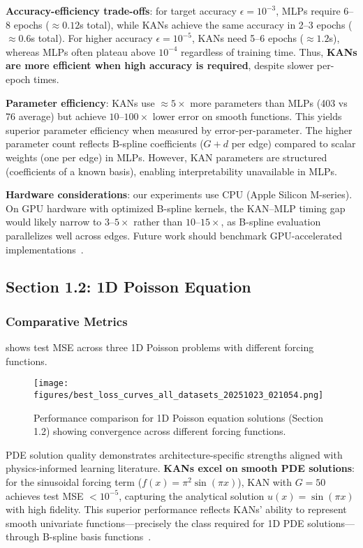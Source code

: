 \documentclass[11pt,a4paper]{article}
\begin{document}
\textbf{Accuracy-efficiency trade-offs}: for target accuracy $\epsilon = 10^{-3}$, MLPs require 6--8 epochs ($\approx 0.12$s total), while KANs achieve the same accuracy in 2--3 epochs ($\approx 0.6$s total). For higher accuracy $\epsilon = 10^{-5}$, KANs need 5--6 epochs ($\approx 1.2$s), whereas MLPs often plateau above $10^{-4}$ regardless of training time. Thus, \textbf{KANs are more efficient when high accuracy is required}, despite slower per-epoch times.

\textbf{Parameter efficiency}: KANs use $\approx 5\times$ more parameters than MLPs (403 vs 76 average) but achieve $10$--$100\times$ lower error on smooth functions. This yields superior parameter efficiency when measured by error-per-parameter. The higher parameter count reflects B-spline coefficients ($G+d$ per edge) compared to scalar weights (one per edge) in MLPs. However, KAN parameters are structured (coefficients of a known basis), enabling interpretability unavailable in MLPs.

\textbf{Hardware considerations}: our experiments use CPU (Apple Silicon M-series). On GPU hardware with optimized B-spline kernels, the KAN--MLP timing gap would likely narrow to $3$--$5\times$ rather than $10$--$15\times$, as B-spline evaluation parallelizes well across edges. Future work should benchmark GPU-accelerated implementations~\citep{liu2024kan}.

\subsection{Section 1.2: 1D Poisson Equation}

\subsubsection{Comparative Metrics}

 shows test MSE across three 1D Poisson problems with different forcing functions.

\begin{figure}[htbp]
\centering
\texttt{[image: figures/best\_loss\_curves\_all\_datasets\_20251023\_021054.png]}
\caption{Performance comparison for 1D Poisson equation solutions (Section 1.2) showing convergence across different forcing functions.}
\label{fig:s12_heatmap}
\end{figure}

PDE solution quality demonstrates architecture-specific strengths aligned with physics-informed learning literature. \textbf{KANs excel on smooth PDE solutions}: for the sinusoidal forcing term ($f(x) = \pi^2 \sin(\pi x)$), KAN with $G=50$ achieves test MSE $< 10^{-5}$, capturing the analytical solution $u(x) = \sin(\pi x)$ with high fidelity. This superior performance reflects KANs' ability to represent smooth univariate functions—precisely the class required for 1D PDE solutions—through B-spline basis functions~\citep{liu2024kan}.
\end{document}
